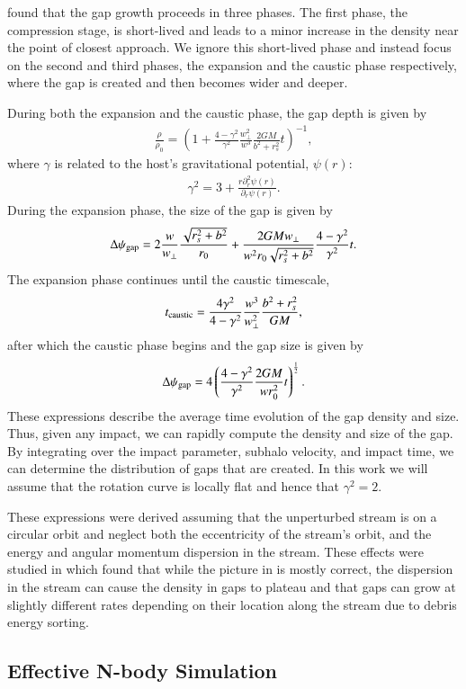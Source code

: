 \documentclass[useAMS,usenatbib]{mn2e}
\newcommand{\eq}[1]{\begin{align}#1\end{align}}
\begin{document}
\cite{three_phases} found that the gap growth proceeds in three phases. The first phase, the compression stage, is short-lived and leads to a minor increase in the density near the point of closest approach. We ignore this short-lived phase and instead focus on the second and third phases, the expansion and the caustic phase respectively, where the gap is created and then becomes wider and deeper. 

During both the expansion and the caustic phase, the gap depth is given by
%
\eq{ \frac{\rho}{\rho_0} = \left( 1 + \frac{4-\gamma^2}{\gamma^2} \frac{w_\perp^2}{w^3} \frac{2 G M}{b^2+r_s^2} t \right)^{-1} , \label{eq:gap_density}}
%
where $\gamma$ is related to the host's gravitational potential, $\psi(r)$:
%
\eq{ \gamma^2 = 3 + \frac{r \partial_r^2 \psi(r)}{ \partial_r \psi(r) } . \label{eq:gamma}}
%
During the expansion phase, the size of the gap is given by
%
\eq{ \Delta \psi_{\rm gap} = 2 \frac{w}{w_\perp} \frac{\sqrt{r_s^2+b^2}}{r_0} + \frac{2 G M w_\perp}{w^2 r_0 \sqrt{r_s^2+b^2} }\frac{4-\gamma^2}{\gamma^2} t . \label{eq:gap_size_grow} }
%
The expansion phase continues until the caustic timescale, 
%
\eq{ t_{\rm caustic} = \frac{4 \gamma^2}{4-\gamma^2} \frac{w^3}{w_\perp^2} \frac{b^2+r_s^2}{GM} , }
%
after which the caustic phase begins and the gap size is given by
%
\eq{ \Delta \psi_{\rm gap} = 4 \left( \frac{4-\gamma^2}{\gamma^2} \frac{2 G M}{w r_0^2} t \right)^{\frac{1}{2}} . \label{eq:gap_size_caustic}}
%
These expressions describe the average time evolution of the gap density and size. Thus, given any impact, we can rapidly compute the density and size of the gap. By integrating over the impact parameter, subhalo velocity, and impact time, we can determine the distribution of gaps that are created. In this work we will assume that the rotation curve is locally flat and hence that $\gamma^2 = 2$. 

These expressions were derived assuming that the unperturbed stream is on a circular orbit and neglect both the eccentricity of the stream's orbit, and the energy and angular momentum dispersion in the stream. These effects were studied in \cite{sanders_bovy_erkal_2015} which found that while the picture in \cite{three_phases} is mostly correct, the dispersion in the stream can cause the density in gaps to plateau and that gaps can grow at slightly different rates depending on their location along the stream due to debris energy sorting. 

\subsection{Effective N-body Simulation} \label{sec:effective_nbody_vel_kicks}
\end{document}
